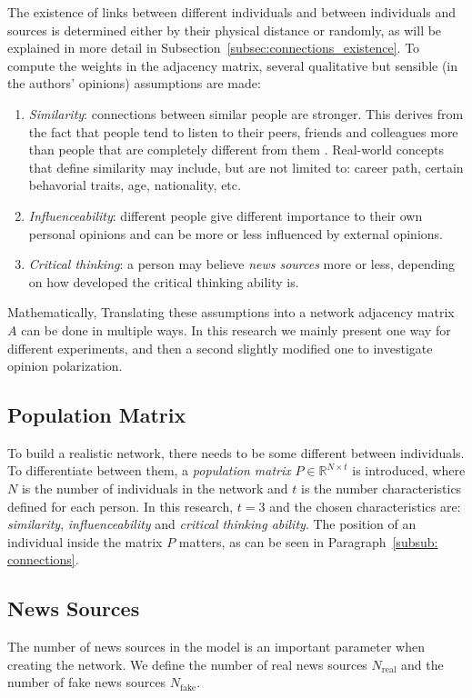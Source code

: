 The existence of links between different individuals and between individuals and sources is determined either by their physical distance or randomly, as will be explained in more detail in Subsection~\ref{subsec:connections_existence}.
To compute the weights in the adjacency matrix, several qualitative but sensible (in the authors' opinions) assumptions are made:
\renewcommand{\theenumi}{\roman{enumi}}
\begin{enumerate}
\item \textit{Similarity}: connections between similar people are stronger. This derives from the fact that people tend to listen to their peers, friends and colleagues more than people that are completely different from them \cite{Youyou2017}\cite{Afifi2013}. Real-world concepts that define similarity may include, but are not limited to: career path, certain behavorial traits, age, nationality, etc.
\item \textit{Influenceability}: different people give different importance to their own personal opinions and can be more or less influenced by external opinions.
\item \textit{Critical thinking}: a person may believe \textit{news sources} more or less, depending on how developed the critical thinking ability  is.
\end{enumerate}
Mathematically, 
Translating these assumptions into a network adjacency matrix $A$ can be done in multiple ways. In this research we mainly present one way for different experiments, and then a second slightly modified one to investigate opinion polarization. 
\subsection{Population Matrix}
To build a realistic network, there needs to be some different between individuals. To differentiate between them, a \textit{population matrix} $P \in \mathbb{R}^{N \times t}$ is introduced, where $N$ is the number of individuals in the network and $t$ is the number characteristics defined for each person. In this research, $t=3$ and the chosen characteristics are: \textit{similarity}, \textit{influenceability} and \textit{critical thinking ability}. The position of an individual inside the matrix $P$ matters, as can be seen in Paragraph~\ref{subsub: connections}.
\subsection{News Sources}
The number of news sources in the model is an important parameter when creating the network. We define the number of real news sources $N_{\text{real}}$ and the number of fake news sources $N_{\text{fake}}$.
